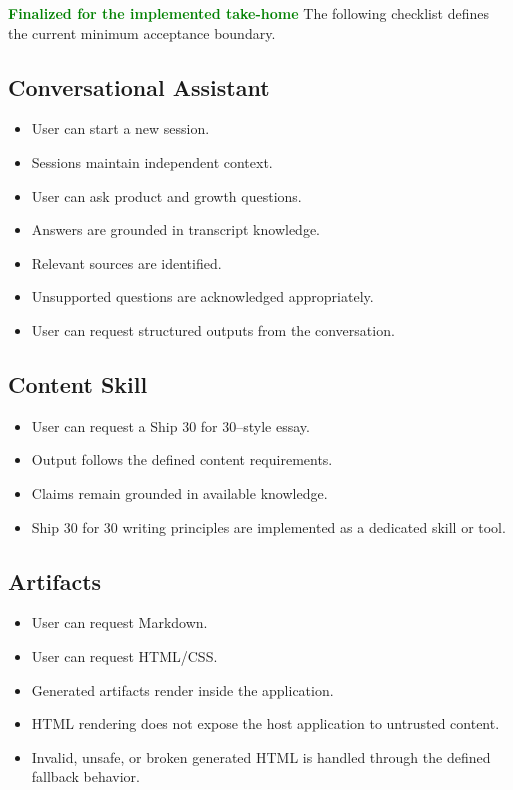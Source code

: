 \documentclass[11pt]{article}
\newcommand{\status}[1]{\textcolor{Green}{\textbf{#1}}}
\newcommand{\checkbox}{\textcolor{Muted}{\ding{113}}}
\begin{document}
\begin{statusbox}{\status{Finalized for the implemented take-home}}
The following checklist defines the current minimum acceptance boundary.
\end{statusbox}

\subsection{Conversational Assistant}
\begin{itemize}[label=\checkbox]
  \item User can start a new session.
  \item Sessions maintain independent context.
  \item User can ask product and growth questions.
  \item Answers are grounded in transcript knowledge.
  \item Relevant sources are identified.
  \item Unsupported questions are acknowledged appropriately.
  \item User can request structured outputs from the conversation.
\end{itemize}

\subsection{Content Skill}
\begin{itemize}[label=\checkbox]
  \item User can request a Ship 30 for 30--style essay.
  \item Output follows the defined content requirements.
  \item Claims remain grounded in available knowledge.
  \item Ship 30 for 30 writing principles are implemented as a dedicated skill or tool.
\end{itemize}

\subsection{Artifacts}
\begin{itemize}[label=\checkbox]
  \item User can request Markdown.
  \item User can request HTML/CSS.
  \item Generated artifacts render inside the application.
  \item HTML rendering does not expose the host application to untrusted content.
  \item Invalid, unsafe, or broken generated HTML is handled through the defined fallback behavior.
\end{itemize}
\end{document}
